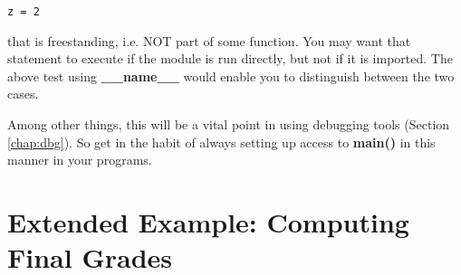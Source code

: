\begin{lstlisting}
z = 2
\end{lstlisting}

that is freestanding, i.e. NOT part of some function.  You may want that
statement to execute if the module is run directly, but not if it is
imported.  The above test using {\bf \_\_name\_\_} would enable you to
distinguish between the two cases.

Among other things, this will be a vital point in using debugging tools
(Section \ref{chap:dbg}).  So get in the habit of always setting up access to
{\bf main()} in this manner in your programs.

\section{Extended Example:  Computing Final Grades}

